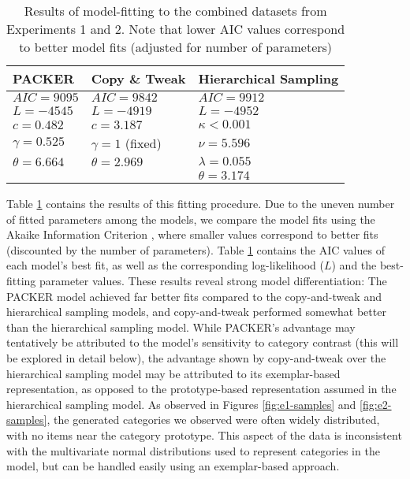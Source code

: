 \documentclass[12pt]{article}
\begin{document}
\begin{flushleft}
\begin{table}
\centering
\caption{Results of model-fitting to the combined datasets from Experiments 1 and 2. Note that lower AIC values correspond to better model fits (adjusted for number of parameters)}
\label{table:global-model-fits}
\begin{tabular}{ l l l}
\\
 \textbf{PACKER}    & \textbf{Copy \& Tweak} & \textbf{Hierarchical Sampling} \\ 
 \hline
 $AIC = 9095$       & $AIC = 9842$          & $AIC = 9912$     \\ 
 $L = -4545$        & $L = -4919$           & $L = -4952$       \\ 
 $c = 0.482$        & $c = 3.187$           & $\kappa < 0.001$  \\
 $\gamma = 0.525$   & $\gamma = 1$ (fixed)  & $\nu = 5.596$     \\ 
 $\theta = 6.664$   & $\theta = 2.969$      & $\lambda = 0.055$    \\ 
                    &                       & $\theta = 3.174$  \\ 
\end{tabular}
\end{table}


Table \ref{table:global-model-fits} contains the results of this fitting procedure. Due to the uneven number of fitted parameters among the models, we compare the model fits using the Akaike Information Criterion \citep[AIC;][]{akaike1974new}, where smaller values correspond to better fits (discounted by the number of parameters). Table \ref{table:global-model-fits} contains the AIC values of each model's best fit, as well as the corresponding log-likelihood ($L$) and the best-fitting parameter values. These results reveal strong model differentiation: The PACKER model achieved far better fits compared to the copy-and-tweak and hierarchical sampling models, and copy-and-tweak performed somewhat better than the hierarchical sampling model. While PACKER's advantage may tentatively be attributed to the model's sensitivity to category contrast (this will be explored in detail below), the advantage shown by copy-and-tweak over the hierarchical sampling model may be attributed to its exemplar-based representation, as opposed to the prototype-based representation assumed in the hierarchical sampling model. As observed in Figures \ref{fig:e1-samples} and \ref{fig:e2-samples}, the generated categories we observed were often widely distributed, with no items near the category prototype. This aspect of the data is inconsistent with the multivariate normal distributions used to represent categories in the \cite{jern2013probabilistic} model, but can be handled easily using an exemplar-based approach. 


\end{flushleft}
\end{document}
